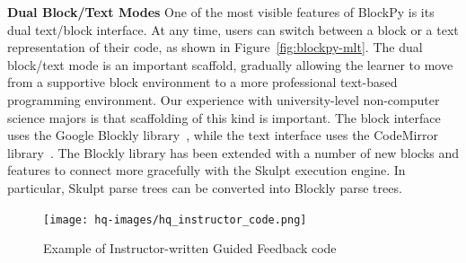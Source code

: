 \documentclass[10pt,journal,compsoc]{IEEEtran}
\begin{document}
\medskip
\textbf{Dual Block/Text Modes}
One of the most visible features of BlockPy is its dual text/block interface.
At any time, users can switch between a block or a text representation of their code, as shown in Figure~\ref{fig:blockpy-mlt}.
The dual block/text mode is an important scaffold, gradually allowing the learner to move from a supportive block environment to a more professional text-based programming environment. Our experience with university-level non-computer science majors is that scaffolding of this kind is important. 
The block interface uses the Google Blockly library~\cite{fraser2013blockly}, while the text interface uses the CodeMirror library~\cite{haverbeke2011codemirror}.
The Blockly library has been extended with a number of new blocks and features to connect more gracefully with the Skulpt execution engine.
In particular, Skulpt parse trees can be converted into Blockly parse trees.

\begin{figure}[!h]
    \centering
    \texttt{[image: hq-images/hq\_instructor\_code.png]}
    \vspace{-\medskipamount}
    \caption{Example of Instructor-written Guided Feedback code}
    \label{fig:guided-feedback-code}
    \vspace{-\medskipamount}
\end{figure}
\end{document}
